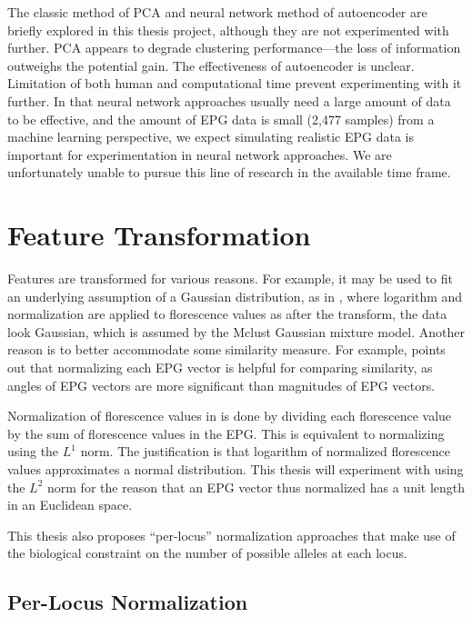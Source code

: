 The classic method of PCA and neural network method of autoencoder are briefly explored in this thesis project, although they are not experimented with further. PCA appears to degrade clustering performance---the loss of information outweighs the potential gain. The effectiveness of autoencoder is unclear. Limitation of both human and computational time prevent experimenting with it further. In that neural network approaches usually need a large amount of data to be effective, and the amount of EPG data is small (2,477 samples) from a machine learning perspective, we expect simulating realistic EPG data is important for experimentation in neural network approaches. We are unfortunately unable to pursue this line of research in the available time frame.

\section{Feature Transformation}

Features are transformed for various reasons. For example, it may be used to fit an underlying assumption of a Gaussian distribution, as in \cite{odonnell_clustering_2021}, where logarithm and normalization are applied to florescence values as after the transform, the data look Gaussian, which is assumed by the Mclust Gaussian mixture model. Another reason is to better accommodate some similarity measure. For example, \cite{odonnell_clustering_2021} points out that normalizing each EPG vector is helpful for comparing similarity, as angles of EPG vectors are more significant than magnitudes of EPG vectors.

Normalization of florescence values in \cite{odonnell_clustering_2021} is done by dividing each florescence value by the sum of florescence values in the EPG. This is equivalent to normalizing using the $L^{1}$ norm. The justification is that logarithm of normalized florescence values approximates a normal distribution. This thesis will experiment with using the $L^{2}$ norm for the reason that an EPG vector thus normalized has a unit length in an Euclidean space.

This thesis also proposes ``per-locus'' normalization approaches that make use of the biological constraint on the number of possible alleles at each locus.

\subsection{Per-Locus Normalization}

